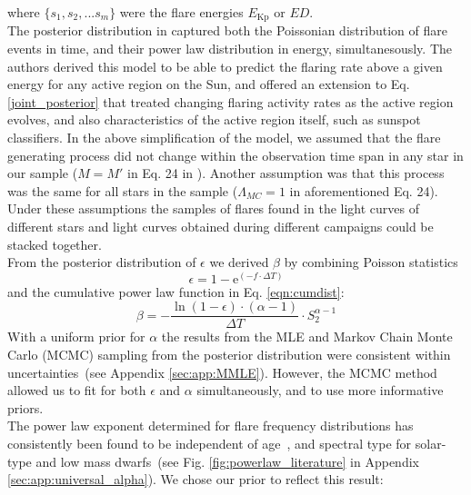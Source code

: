 \documentclass{aa}
\begin{document}
where $\{s_1,s_2,...s_m\}$ were the flare energies $E_\mathrm{Kp}$ or $ED$.
\\
The posterior distribution in \citet{wheatland_flaresbayes_2004} captured both the Poissonian distribution of flare events in time, and their power law distribution in energy, simultanesously. The authors derived this model to be able to predict the flaring rate above a given energy for any active region on the Sun, and offered an extension to Eq. \ref{joint_posterior} that treated changing flaring activity rates as the active region evolves, and also characteristics of the active region itself, such as sunspot classifiers. In the above simplification of the model, we assumed that the flare generating process did not change within the observation time span in any star in our sample ($M=M'$ in Eq. 24 in \citet{wheatland_flaresbayes_2004}). Another assumption was that this process was the same for all stars in the sample ($\Lambda_{MC}=1$ in aforementioned Eq. 24). Under these assumptions the samples of flares found in the light curves of different stars and light curves obtained during different campaigns could be stacked together.
\\
From the posterior distribution of $\epsilon$ we derived $\beta$ by combining Poisson statistics 
\begin{equation}
\epsilon = 1 - \mathrm{e}^{(-f\cdot\Delta T)}
\label{poissonstats}
\end{equation}
and the cumulative power law function in Eq. \ref{eqn:cumdist}:
\begin{equation}
\beta = - \dfrac{\ln(1 - \epsilon)\cdot (\alpha -1)}{\Delta T} \cdot S_2^{\alpha -1}
\label{eqn:epstobeta}
\end{equation}
With a uniform prior for $\alpha$ the results from the MLE and Markov Chain Monte Carlo (MCMC) sampling from the posterior distribution were consistent within uncertainties~(see Appendix \ref{sec:app:MMLE}). However, the MCMC method allowed us to fit for both $\epsilon$ and $\alpha$ simultaneously, and to use more informative priors. 
\\
The power law exponent determined for flare frequency distributions has consistently been found to be independent of age~\citep{davenport_flaresevolve_2019}, and spectral type for solar-type and low mass dwarfs~(see Fig. \ref{fig:powerlaw_literature} in Appendix \ref{sec:app:universal_alpha}). We chose our prior to reflect this result: 
\end{document}
